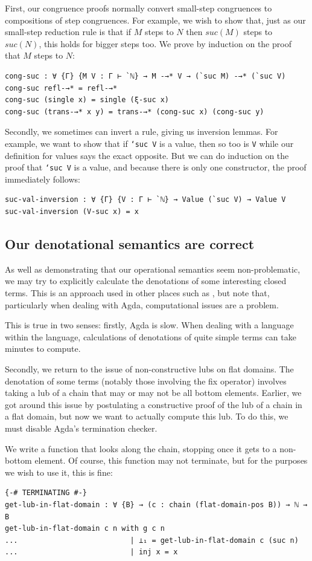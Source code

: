 \documentclass[12pt,a4paper,twoside,openright]{report}
\begin{document}
First, our congruence proofs normally convert small-step congruences to compositions of step congruences. For example, we wish to show that, just as our small-step reduction rule is that if $M$ steps to $N$ then $suc(M)$ steps to $suc(N)$, this holds for bigger steps too. We prove by induction on the proof that $M$ steps to $N$:
\begin{verbatim}
cong-suc : ∀ {Γ} {M V : Γ ⊢ `ℕ} → M -→* V → (`suc M) -→* (`suc V)
cong-suc refl-→* = refl-→*
cong-suc (single x) = single (ξ-suc x)
cong-suc (trans-→* x y) = trans-→* (cong-suc x) (cong-suc y)
\end{verbatim}
Secondly, we sometimes can invert a rule, giving us inversion lemmas. For example, we want to show that if \texttt{`suc V}  is a value, then so too is \texttt{V} while our definition for values says the exact opposite. But we can do induction on the proof that \texttt{`suc V} is a value, and because there is only one constructor, the proof immediately follows:
\begin{verbatim}
suc-val-inversion : ∀ {Γ} {V : Γ ⊢ `ℕ} → Value (`suc V) → Value V
suc-val-inversion (V-suc x) = x
\end{verbatim} 
\subsection{Our denotational semantics are correct}
As well as demonstrating that our operational semantics seem non-problematic, we may try to explicitly calculate the denotations of some interesting closed terms. This is an approach used in other places such as \cite{Hart} \cite{C-DenSem2}, but note that, particularly when dealing with Agda, computational issues are a problem. 

This is true in two senses: firstly, Agda is slow. When dealing with a language within the language, calculations of denotations of quite simple terms can take minutes to compute.

Secondly, we return to the issue of non-constructive lubs on flat domains. The denotation of some terms (notably those involving the fix operator) involves taking a lub of a chain that may or may not be all bottom elements. Earlier, we got around this issue by postulating a constructive proof of the lub of a chain in a flat domain, but now we want to actually compute this lub. To do this, we must disable Agda's termination checker. 

We write a function that looks along the chain, stopping once it gets to a non-bottom element. Of course, this function may not terminate, but for the purposes we wish to use it, this is fine:
\begin{verbatim}
{-# TERMINATING #-}
get-lub-in-flat-domain : ∀ {B} → (c : chain (flat-domain-pos B)) → ℕ → B
get-lub-in-flat-domain c n with g c n
...                          | ⊥₁ = get-lub-in-flat-domain c (suc n)
...                          | inj x = x
\end{verbatim}
\end{document}
